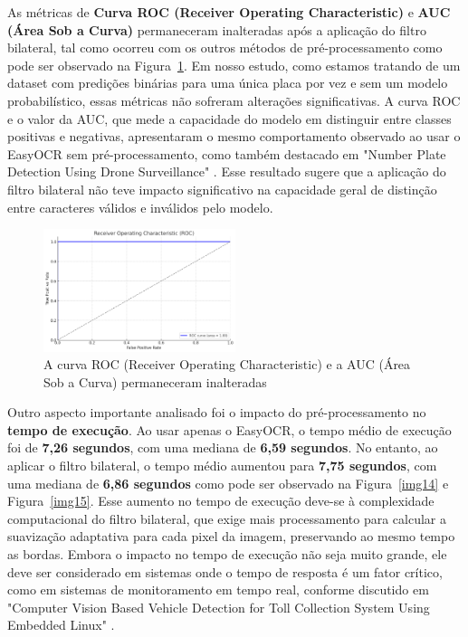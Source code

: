 \documentclass[conference]{IEEEtran}
\begin{document}
As métricas de \textbf{Curva ROC (Receiver Operating Characteristic)} e \textbf{AUC (Área Sob a Curva)} permaneceram inalteradas após a aplicação do filtro bilateral, tal como ocorreu com os outros métodos de pré-processamento como pode ser observado na Figura~\ref{img13}. Em nosso estudo, como estamos tratando de um dataset com predições binárias para uma única placa por vez e sem um modelo probabilístico, essas métricas não sofreram alterações significativas. A curva ROC e o valor da AUC, que mede a capacidade do modelo em distinguir entre classes positivas e negativas, apresentaram o mesmo comportamento observado ao usar o EasyOCR sem pré-processamento, como também destacado em "Number Plate Detection Using Drone Surveillance" \cite{b15}. Esse resultado sugere que a aplicação do filtro bilateral não teve impacto significativo na capacidade geral de distinção entre caracteres válidos e inválidos pelo modelo.

\begin{figure}[htbp]
	\centerline{\includegraphics[width=0.5\textwidth]{img13.png}}
	\caption{A curva ROC (Receiver Operating Characteristic) e a AUC (Área Sob a Curva) permaneceram inalteradas }
	\label{img13}
\end{figure}

Outro aspecto importante analisado foi o impacto do pré-processamento no \textbf{tempo de execução}. Ao usar apenas o EasyOCR, o tempo médio de execução foi de \textbf{7,26 segundos}, com uma mediana de \textbf{6,59 segundos}. No entanto, ao aplicar o filtro bilateral, o tempo médio aumentou para \textbf{7,75 segundos}, com uma mediana de \textbf{6,86 segundos} como pode ser observado na Figura~\ref{img14} e Figura~\ref{img15}. Esse aumento no tempo de execução deve-se à complexidade computacional do filtro bilateral, que exige mais processamento para calcular a suavização adaptativa para cada pixel da imagem, preservando ao mesmo tempo as bordas. Embora o impacto no tempo de execução não seja muito grande, ele deve ser considerado em sistemas onde o tempo de resposta é um fator crítico, como em sistemas de monitoramento em tempo real, conforme discutido em "Computer Vision Based Vehicle Detection for Toll Collection System Using Embedded Linux" \cite{b16}.
\end{document}
